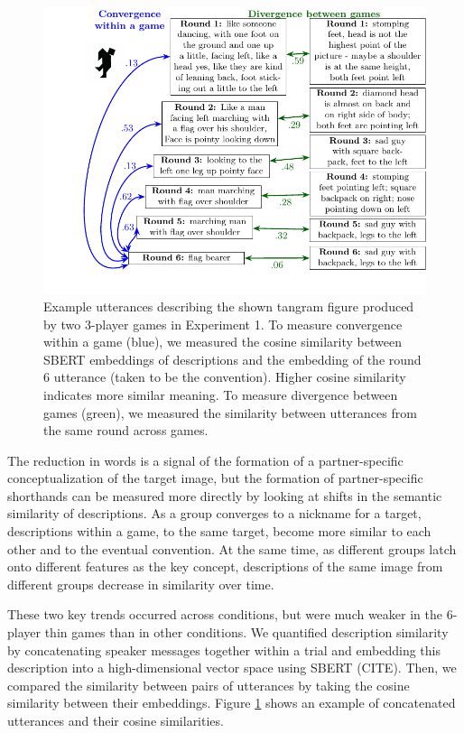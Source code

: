 \documentclass[
  english,
  a4paper,
]{article}
\begin{document}
\begin{figure}[t!]

{\centering \includegraphics[width=1\linewidth]{sbert} 

}

\caption{Example utterances describing the shown tangram figure produced by two 3-player games in Experiment 1. To measure convergence within a game (blue), we measured the cosine similarity between SBERT embeddings of descriptions and the embedding of the round 6 utterance (taken to be the convention). Higher cosine similarity indicates more similar meaning. To measure divergence between games (green), we measured the similarity between utterances from the same round across games.}\label{fig:sbert-diagram}
\end{figure}

The reduction in words is a signal of the formation of a partner-specific conceptualization of the target image, but the formation of partner-specific shorthands can be measured more directly by looking at shifts in the semantic similarity of descriptions. As a group converges to a nickname for a target, descriptions within a game, to the same target, become more similar to each other and to the eventual convention. At the same time, as different groups latch onto different features as the key concept, descriptions of the same image from different groups decrease in similarity over time.

These two key trends occurred across conditions, but were much weaker in the 6-player thin games than in other conditions. We quantified description similarity by concatenating speaker messages together within a trial and embedding this description into a high-dimensional vector space using SBERT (CITE). Then, we compared the similarity between pairs of utterances by taking the cosine similarity between their embeddings. Figure \ref{fig:sbert-diagram} shows an example of concatenated utterances and their cosine similarities.
\end{document}

